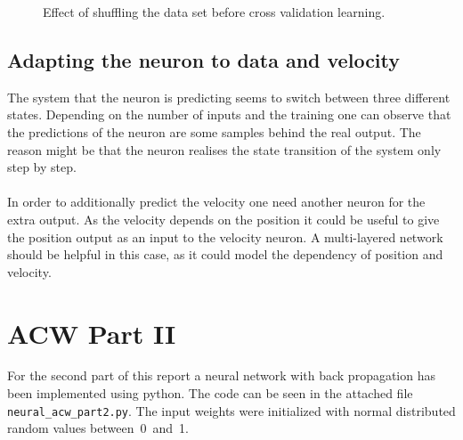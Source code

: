 \documentclass[12pt, a4paper]{article}
\newcounter{task}
\begin{document}
\begin{figure}[htbp]
	\caption{Effect of shuffling the data set before cross validation learning.}
	\label{fig:cross-validation}
\end{figure}

\subsection*{Adapting the neuron to data and velocity}
The system that the neuron is predicting seems to switch between three different states. Depending on the number of inputs and the training one can observe that the predictions of the neuron are some samples behind the real output. The reason might be that the neuron realises the state transition of the system only step by step.\\\\
In order to additionally predict the velocity one need another neuron for the extra output. As the velocity depends on the position it could be useful to give the position output as an input to the velocity neuron. A multi-layered network should be helpful in this case, as it could model the dependency of position and velocity.

\section*{ACW Part II}

For the second part of this report a neural network with back propagation has been implemented using python. The code can be seen in the attached file \texttt{neural\_acw\_part2.py}. The input weights were initialized with normal distributed random values between~0~and~1.
\end{document}
